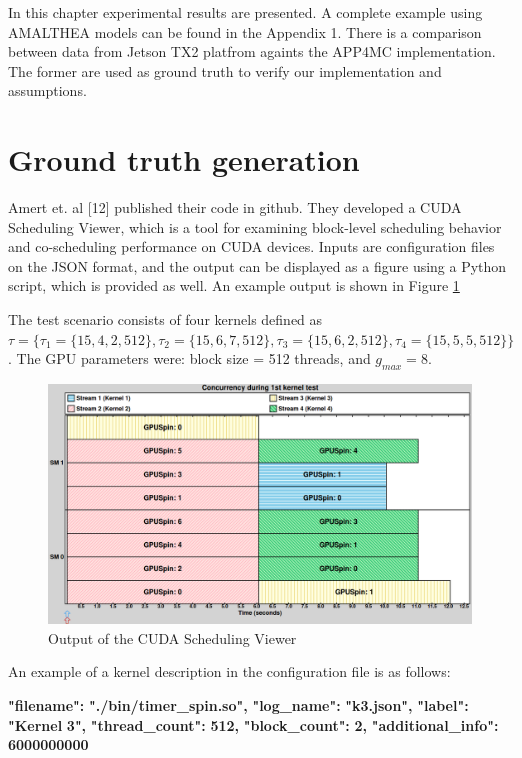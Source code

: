 \documentclass[
  12pt,
  a4paperpaper,
]{report}
\newenvironment{Shaded}{}{}
\newcommand{\ErrorTok}[1]{\textcolor[rgb]{1.00,0.00,0.00}{\textbf{#1}}}
\begin{document}
In this chapter experimental results are presented. A complete example
using AMALTHEA models can be found in the Appendix 1. There is a comparison 
between data from Jetson TX2 platfrom againts the APP4MC implementation. The former
are used as ground truth to verify our implementation and assumptions.

\hypertarget{ground-truth-generation}{%
\section{Ground truth generation}\label{ground-truth-generation}}

Amert et. al {[}12{]} published their code in github. They developed a
CUDA Scheduling Viewer, which is a tool for examining block-level
scheduling behavior and co-scheduling performance on CUDA devices. 
Inputs are configuration files on the JSON format, and the output can be
displayed as a figure using a Python script, which is provided as well. An
example output is shown in Figure \ref{img:nvidia-base}

The test scenario consists of four kernels defined as \(\tau = \{\tau_1 = \{15, 4, 2, 512\} , \tau_2 = \{15, 6,7,512\}, \tau_3 = \{15, 6,2,512\}, \tau_4 =\{ 15, 5,5,512\} \}\).
The GPU parameters were: block size = 512 threads, and \(g_{max} = 8\).

\begin{figure}
\centering
\includegraphics{source/figures/nvidia/base.png}
\caption{Output of the CUDA Scheduling Viewer \label{img:nvidia-base}}
\end{figure}

An example of a kernel description in the configuration file is as
follows:

\begin{Shaded}
\begin{Highlighting}[]
      \ErrorTok{"filename":} \ErrorTok{"./bin/timer\_spin.so",}
      \ErrorTok{"log\_name":} \ErrorTok{"k3.json",}
      \ErrorTok{"label":} \ErrorTok{"Kernel} \ErrorTok{3",}
      \ErrorTok{"thread\_count":} \ErrorTok{512,}
      \ErrorTok{"block\_count":} \ErrorTok{2,}
      \ErrorTok{"additional\_info":} \ErrorTok{6000000000}
\end{Highlighting}
\end{Shaded}
\end{document}
